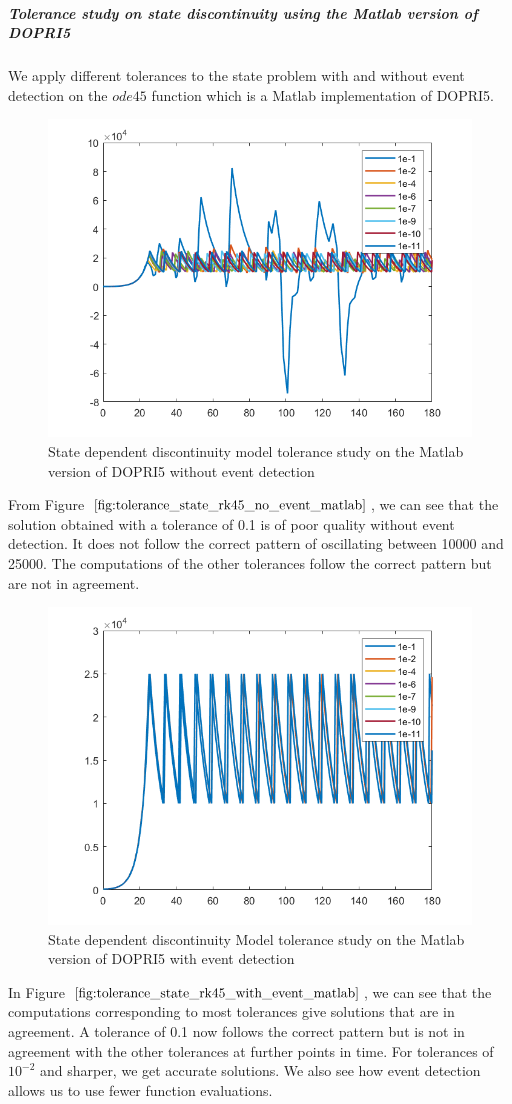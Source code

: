 \subparagraph{Tolerance study on state discontinuity using the Matlab version of DOPRI5}
We apply different tolerances to the state problem with and without event detection on the $ode45$ function which is a Matlab implementation of DOPRI5.

\begin{figure}[h]
\centering
\includegraphics[width=0.7\linewidth]{./figures/tolerance_state_rk45_no_event_matlab}
\caption{State dependent discontinuity model tolerance study on the Matlab version of DOPRI5 without event detection}
\label{fig:tolerance_state_rk45_no_event_matlab}
\end{figure}

From Figure $\ref{fig:tolerance_state_rk45_no_event_matlab}$, we can see that the solution obtained with a tolerance of 0.1 is of poor quality without event detection. It does not follow the correct pattern of oscillating between 10000 and 25000. The computations of the other tolerances follow the correct pattern but are not in agreement.

\begin{figure}[h]
\centering
\includegraphics[width=0.7\linewidth]{./figures/tolerance_state_rk45_with_event_matlab}
\caption{State dependent discontinuity Model tolerance study on the Matlab version of DOPRI5 with event detection}
\label{fig:tolerance_state_rk45_with_event_matlab}
\end{figure}
In Figure $\ref{fig:tolerance_state_rk45_with_event_matlab}$, we can see that the computations corresponding to most tolerances give solutions that are in agreement. A tolerance of 0.1 now follows the correct pattern but is not in agreement with the other tolerances at further points in time. For tolerances of $10^{-2}$ and sharper, we get accurate solutions. We also see how event detection allows us to use fewer function evaluations.

